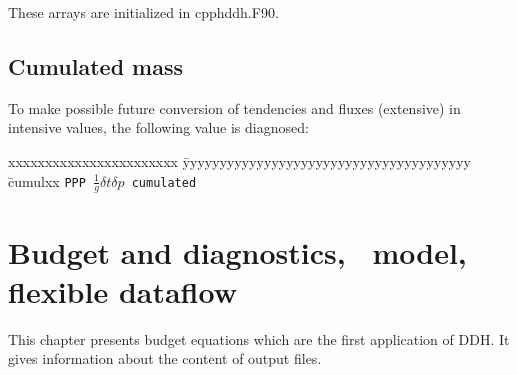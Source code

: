 \noi These arrays are initialized in cpphddh.F90.

\section{Cumulated mass}

To make possible future conversion of tendencies and fluxes (extensive) in intensive values, the following value is diagnosed:
\begin{tabbing}
xxxxxxxxxxxxxxxxxxxxxxx \= yyyyyyyyyyyyyyyyyyyyyyyyyyyyyyyyyyyyyyy \= cumulxx \kill
\tt PPP \> $\frac{1}{g}\delta t \delta p$ \> cumulated\\[1ex]
\end{tabbing}

\chapter{Budget and diagnostics, \arp\ model, flexible dataflow}
\label{chap_flexible_arpege}
\null
\vspace{1cm}
This chapter presents budget equations which are the first application of DDH. It gives information about the content of output files.
